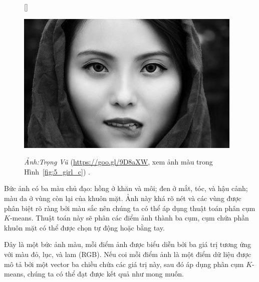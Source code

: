 \begin{figure}[t]
[\FBwidth]
{\caption{
\textit{Ảnh:Trọng Vũ} (\url{https://goo.gl/9D8aXW}, xem ảnh màu trong Hình~\ref{fig:5_girl_c}) .
}
\label{fig:5_girl}}
{ %
\includegraphics[width=.5\textwidth]{Chapters/03_SimpleML/4_kmeans/girl3_gray.jpg}
}
\end{figure}






Bức ảnh có ba màu chủ đạo: hồng ở khăn và môi; đen ở mắt, tóc, và hậu cảnh; màu
da ở vùng còn lại của khuôn mặt. Ảnh này khá rõ nét và các vùng được phân biệt
rõ ràng bởi màu sắc nên chúng ta có thể áp dụng thuật toán phân cụm $K$-means.
Thuật toán này sẽ phân các điểm ảnh thành ba cụm, cụm chứa phần khuôn mặt có thể được chọn tự động hoặc bằng tay.

Đây là một bức ảnh màu, mỗi điểm ảnh được biểu diễn bởi ba giá trị tương ứng với
màu đỏ, lục, và lam (RGB). Nếu coi mỗi điểm ảnh là một điểm dữ liệu được mô tả
bởi một vector ba chiều chứa các giá trị này, sau đó áp dụng phân cụm $K$-means,
chúng ta có thể đạt được kết quả như mong muốn.



